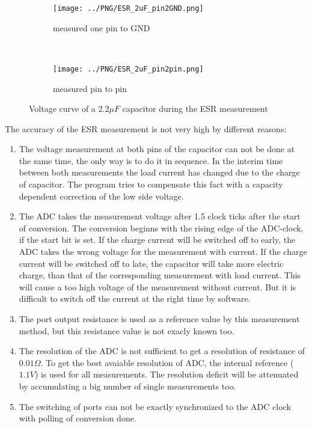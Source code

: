 \begin{figure}[H]
  \begin{subfigure}[b]{9cm}
    \centering
    \texttt{[image: ../PNG/ESR\_2uF\_pin2GND.png]}
    \caption{measured one pin to GND}
  \end{subfigure}
  ~ 
  \begin{subfigure}[b]{9cm}
    \centering
    \texttt{[image: ../PNG/ESR\_2uF\_pin2pin.png]}
    \caption{measured pin to pin}
  \end{subfigure}
  \caption{Voltage curve of a \(2.2\mu F\) capacitor during the ESR measurement}
  \label{pic:esr2}
\end{figure}



The accuracy of the ESR measurement is not very high by different reasons:
\begin{enumerate}
\item The voltage measurement at both pins of the capacitor can not be done at the same time, the only way is to do it in sequence.
In the interim time between both measurements the load current has changed due to the charge of capacitor.
The program tries to compensate this fact with a capacity dependent correction of the low side voltage.
\item The ADC takes the measurement voltage after 1.5 clock ticks after the start of conversion.
The conversion beginns with the rising edge of the ADC-clock, if the start bit is set.
If the charge current will be switched off to early, the ADC takes the wrong voltage for the measurement with current.
If the charge current will be switched off to late, the capacitor will take more electric charge, than that of the
corresponding measurement with load current. This will cause a too high voltage of the measurement without current.
But it is difficult to switch off the current at the right time by software. 
\item The port output resistance is used as a reference value by this measurement method, but this resistance value is
not exacly known too.
\item The resolution of the ADC is not sufficient to get a resolution of resistance of \(0.01\Omega\).
To get the best avaiable resolution of ADC, the internal reference (\(1.1V\)) is used for all measurements.
The resolution deficit will be attenuated by accumulating a big number of single measurements too.
\item The switching of ports can not be exactly synchronized to the ADC clock with polling of conversion done.
\end{enumerate}

